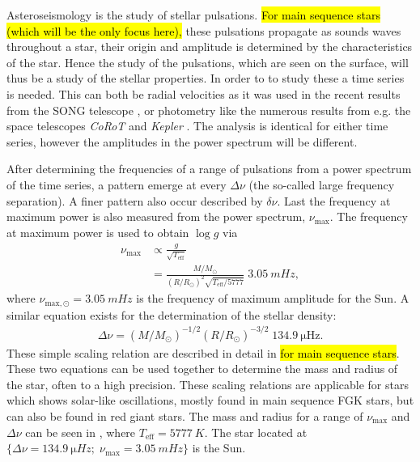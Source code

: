 Asteroseismology is the study of stellar pulsations. \hl{For main sequence stars (which will be the
only focus here),} these pulsations propagate as sounds waves throughout a star, their origin and
amplitude is determined by the characteristics of the star. Hence the study of the pulsations, which
are seen on the surface, will thus be a study of the stellar properties. In order to to study these
a time series is needed. This can both be radial velocities as it was used in the recent results
from the SONG telescope \citep{Grundahl2017}, or photometry like the numerous results from e.g. the
space telescopes \emph{CoRoT} and \emph{Kepler} \citep[see
e.g.][]{Christensen-Dalsgaard2010,Chaplin2011,Huber2014}. The analysis is identical for either time
series, however the amplitudes in the power spectrum will be different.

After determining the frequencies of a range of pulsations from a power spectrum of the time series,
a pattern emerge at every $\Delta\nu$ (the so-called large frequency separation). A finer pattern
also occur described by $\delta\nu$. Last the frequency at maximum power is also measured from the
power spectrum, $\nu_\mathrm{max}$. The frequency at maximum power is used to obtain $\log g$ via
\begin{align}
  \nu_\mathrm{max} &\propto \frac{g}{\sqrt{T_\mathrm{eff}}} \\
                   &= \frac{M/M_\odot}{(R/R_\odot)^2 \sqrt{T_\mathrm{eff}/5777}}\; \SI{3.05}{mHz},\label{eq:scaling1}
\end{align}
where $\nu_{\mathrm{max},\odot}=\SI{3.05}{mHz}$ is the frequency of maximum amplitude for the Sun. A
similar equation exists for the determination of the stellar density:
\begin{align}
  \Delta\nu = (M/M_\odot)^{-1/2} (R/R_\odot)^{-3/2}\; \SI{134.9}{\micro\hertz}.
\end{align}
These simple scaling relation are described in detail in \citet{Kjeldsen1995} \hl{for main sequence
stars}. These two equations can be used together to determine the mass and radius of the star, often
to a high precision. These scaling relations are applicable for stars which shows solar-like
oscillations, mostly found in main sequence FGK stars, but can also be found in red giant stars. The
mass and radius for a range of $\nu_\mathrm{max}$ and $\Delta\nu$ can be seen in ,
where $T_\mathrm{eff}=\SI{5777}{K}$. The star located at $\{\Delta\nu=\SI{134.9}{\micro
Hz};\;\nu_\mathrm{max}=\SI{3.05}{mHz}\}$ is the Sun.

